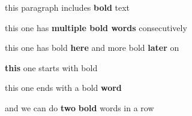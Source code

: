 
this paragraph includes \textbf{bold}  text

this one has \textbf{multiple bold words} consecutively

this one has bold \textbf{here} and more bold \textbf{later}  on

\textbf{this} one starts with bold

this one ends with a bold \textbf{word}

and we can do \textbf{two} \textbf{bold} words in a row

